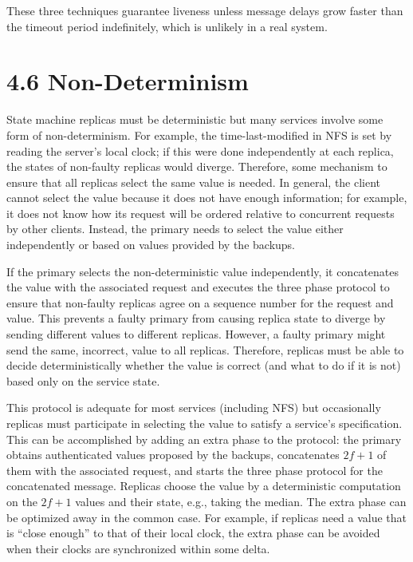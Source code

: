 \documentclass[
]{article}
\begin{document}
These three techniques guarantee liveness unless message delays grow
faster than the timeout period indefinitely, which is unlikely in a real
system.

\section{4.6 Non-Determinism}\label{non-determinism}

State machine replicas must be deterministic but many services involve
some form of non-determinism. For example, the time-last-modified in NFS
is set by reading the server's local clock; if this were done
independently at each replica, the states of non-faulty replicas would
diverge. Therefore, some mechanism to ensure that all replicas select
the same value is needed. In general, the client cannot select the value
because it does not have enough information; for example, it does not
know how its request will be ordered relative to concurrent requests by
other clients. Instead, the primary needs to select the value either
independently or based on values provided by the backups.

If the primary selects the non-deterministic value independently, it
concatenates the value with the associated request and executes the
three phase protocol to ensure that non-faulty replicas agree on a
sequence number for the request and value. This prevents a faulty
primary from causing replica state to diverge by sending different
values to different replicas. However, a faulty primary might send the
same, incorrect, value to all replicas. Therefore, replicas must be able
to decide deterministically whether the value is correct (and what to do
if it is not) based only on the service state.

This protocol is adequate for most services (including NFS) but
occasionally replicas must participate in selecting the value to satisfy
a service's specification. This can be accomplished by adding an extra
phase to the protocol: the primary obtains authenticated values proposed
by the backups, concatenates \(2f + 1\) of them with the associated
request, and starts the three phase protocol for the concatenated
message. Replicas choose the value by a deterministic computation on the
\(2f + 1\) values and their state, e.g., taking the median. The extra
phase can be optimized away in the common case. For example, if replicas
need a value that is ``close enough'' to that of their local clock, the
extra phase can be avoided when their clocks are synchronized within
some delta.
\end{document}
